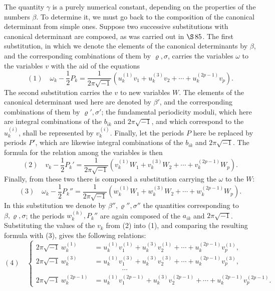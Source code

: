 \documentclass[10pt]{article}
\begin{document}
The quantity \(\gamma\) is a purely numerical constant, depending on the properties of the numbers \(\beta\). To determine it, we must go back to the composition of the canonical determinant from simple ones. Suppose two successive substitutions with canonical determinant are composed, as was carried out in \(\S\,85\). The first substitution, in which we denote the elements of the canonical determinants by \(\beta\), and the corresponding combinations of them by \(\varrho,\sigma\), carries the variables \(\omega\) to the variables \(v\) with the aid of the equations
\[
(1)\quad
\omega_k-\frac12P_k
=\frac{1}{2\pi\sqrt{-1}}\left(u_k^{(1)}v_1+u_k^{(3)}v_2+\cdots+u_k^{(2p-1)}v_p\right).
\]
The second substitution carries the \(v\) to new variables \(W\). The elements of the canonical determinant used here are denoted by \(\beta'\), and the corresponding combinations of them by \(\varrho',\sigma'\); the fundamental periodicity moduli, which here are integral combinations of the \(b_{ik}\) and \(2\pi\sqrt{-1}\), and which correspond to the \(u_k^{(i)}\), shall be represented by \(v_k^{(i)}\). Finally, let the periods \(P\) here be replaced by periods \(P'\), which are likewise integral combinations of the \(b_{ik}\) and \(2\pi\sqrt{-1}\). The formula for the relation among the variables is then
\[
(2)\quad
v_k-\frac12P_k'
=\frac{1}{2\pi\sqrt{-1}}\left(v_k^{(1)}W_1+v_k^{(3)}W_2+\cdots+v_k^{(2p-1)}W_p\right).
\]
Finally, from these two there is composed a substitution carrying the \(\omega\) to the \(W\):
\[
(3)\quad
\omega_k-\frac12P_k''
=\frac{1}{2\pi\sqrt{-1}}\left(w_k^{(1)}W_1+w_k^{(3)}W_2+\cdots+w_k^{(2p-1)}W_p\right).
\]
In this substitution we denote by \(\beta'',\varrho'',\sigma''\) the quantities corresponding to \(\beta,\varrho,\sigma\); the periods \(w_k^{(h)},P_k''\) are again composed of the \(a_{ik}\) and \(2\pi\sqrt{-1}\). Substituting the values of the \(v_k\) from (2) into (1), and comparing the resulting formula with (3), gives the following relations:
\[
(4)\quad
\left\{\begin{aligned}
2\pi\sqrt{-1}\,w_k^{(1)}&=u_k^{(1)}v_1^{(1)}+u_k^{(3)}v_2^{(1)}+\cdots+u_k^{(2p-1)}v_p^{(1)},\\
2\pi\sqrt{-1}\,w_k^{(3)}&=u_k^{(1)}v_1^{(3)}+u_k^{(3)}v_2^{(3)}+\cdots+u_k^{(2p-1)}v_p^{(3)},\\
&\hspace{4em}\cdots\\
2\pi\sqrt{-1}\,w_k^{(2p-1)}&=u_k^{(1)}v_1^{(2p-1)}+u_k^{(3)}v_2^{(2p-1)}+\cdots+u_k^{(2p-1)}v_p^{(2p-1)}.
\end{aligned}\right.
\]
\end{document}
